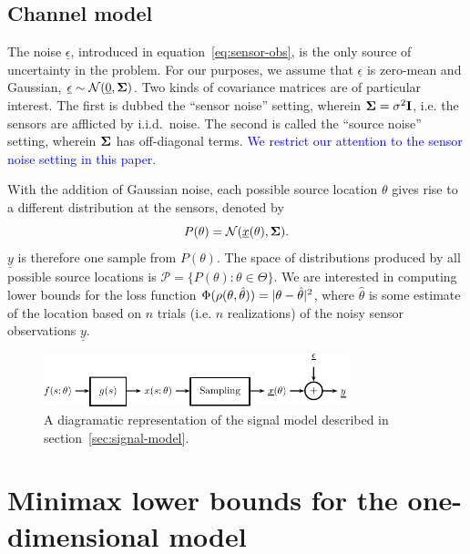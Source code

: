 \documentclass[conference]{IEEEtran}
\providecommand{\v}{}
\renewcommand{\v}[1]{\underline{#1}}
\providecommand{\m}{}
\renewcommand{\m}[1]{{\bf #1}}
\DeclarePairedDelimiter\abs{\lvert}{\rvert}
\begin{document}
\subsection{Channel model}
\label{sec:channel-model}

The noise $\v \epsilon$, introduced in equation~\eqref{eq:sensor-obs}, is
the only source of uncertainty in the problem. For our purposes, we assume that
$\v \epsilon$ is zero-mean and Gaussian, $\v \epsilon \sim \mathcal{N}(\v 0, \m
\Sigma)$. Two kinds of covariance matrices are of particular interest. The
first is dubbed the ``sensor noise'' setting, wherein $\m\Sigma = \sigma^2 \m
I$, i.e. the sensors are afflicted by i.i.d.\ noise. The second is called the
``source noise'' setting, wherein $\m\Sigma$ has off-diagonal terms. \textcolor{blue}{We
restrict our attention to the sensor noise setting in this paper.}

With the addition of Gaussian noise, each possible source location $\theta$
gives rise to a different distribution at the sensors, denoted by
\begin{equation} \label{eq:p-theta}
	P(\theta) = \mathcal{N}(\v x(\theta), \m \Sigma).
\end{equation}
$\v y$ is therefore one sample from $P(\theta)$. The space of distributions
produced by all possible source locations is $\mathcal{P} = \{P(\theta) :
\theta \in \Theta \}$. We are interested in computing lower bounds for the loss
function $\Phi(\rho(\theta, \hat\theta)) = \abs{\theta - \hat\theta}^2$, where
$\hat\theta$ is some estimate of the location based on $n$ trials (i.e. $n$
realizations) of the noisy sensor observations $\v y$.

\begin{figure}[tp] %
	\centering
	\includegraphics[width=3.5in]{block-diagram}
	\caption{A diagramatic representation of the signal model described in
	section~\ref{sec:signal-model}.}
	\label{fig:signal-model}
\end{figure}

\section{Minimax lower bounds for the one-dimensional model}
\label{sec:minimax-lower-bounds}
\end{document}
